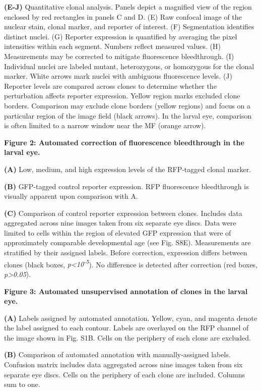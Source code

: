 \textbf{(E-J)} Quantitative clonal analysis. Panels depict a magnified view of the region enclosed by red rectangles in panels C and D. (E) Raw confocal image of the nuclear stain, clonal marker, and reporter of interest. (F) Segmentation identifies distinct nuclei. (G) Reporter expression is quantified by averaging the pixel intensities within each segment. Numbers reflect measured values. (H) Measurements may be corrected to mitigate fluorescence bleedthrough. (I) Individual nuclei are labeled mutant, heterozygous, or homozygous for the clonal marker. White arrows mark nuclei with ambiguous fluorescence levels. (J) Reporter levels are compared across clones to determine whether the perturbation affects reporter expression. Yellow region marks excluded clone borders. Comparison may exclude clone borders (yellow regions) and focus on a particular region of the image field (black arrows). In the larval eye, comparison is often limited to a narrow window near the MF (orange arrow).

\textbf{Figure 2: Automated correction of fluorescence bleedthrough in the larval eye. }

\textbf{(A)} Low, medium, and high expression levels of the RFP-tagged clonal marker.

\textbf{(B)} GFP-tagged control reporter expression. RFP fluorescence bleedthrough is visually apparent upon comparison with A.

\textbf{(C)} Comparison of control reporter expression between clones. Includes data aggregated across nine images taken from six separate eye discs. Data were limited to cells within the region of elevated GFP expression that were of approximately comparable developmental age (see Fig. S8E). Measurements are stratified by their assigned labels. Before correction, expression differs between clones (black boxes, \emph{p\textless{}10\textsuperscript{-5}}). No difference is detected after correction (red boxes, \emph{p\textgreater{}0.05}).

\textbf{Figure 3: Automated unsupervised annotation of clones in the larval eye.}

\textbf{(A)} Labels assigned by automated annotation. Yellow, cyan, and magenta denote the label assigned to each contour. Labels are overlayed on the RFP channel of the image shown in Fig. S1B. Cells on the periphery of each clone are excluded.

\textbf{(B)} Comparison of automated annotation with manually-assigned labels. Confusion matrix includes data aggregated across nine images taken from six separate eye discs. Cells on the periphery of each clone are included. Columns sum to one.

